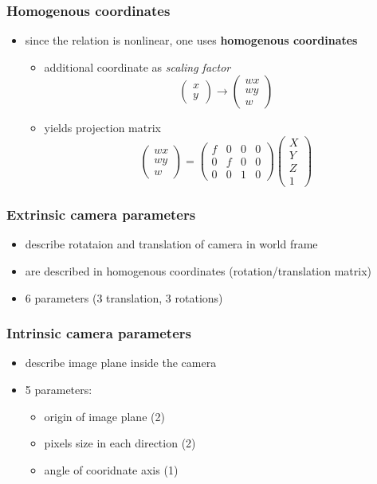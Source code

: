 \documentclass[11pt]{article}
\begin{document}
\subsubsection{Homogenous coordinates}
\label{sec-6-1-1}
\begin{itemize}
\item since the relation is nonlinear, one uses \textbf{homogenous coordinates}
\begin{itemize}
\item additional coordinate as \emph{scaling factor}
       \[ \begin{pmatrix} x\\y \end{pmatrix}
          \rightarrow \begin{pmatrix} wx \\wy \\ w \end{pmatrix} \]
\item yields projection matrix
       \[ \begin{pmatrix} wx \\wy \\ w \end{pmatrix}
          = \begin{pmatrix} f&0&0&0 \\ 0&f&0&0 \\ 0&0&1&0 
            \end{pmatrix}\begin{pmatrix} X\\Y\\Z\\1 \end{pmatrix} \]
\end{itemize}
\end{itemize}
\subsubsection{Extrinsic camera parameters}
\label{sec-6-1-2}
\begin{itemize}
\item describe rotataion and  translation of camera in world frame
\item are described in homogenous coordinates (rotation/translation matrix)
\item 6 parameters (3 translation, 3 rotations)
\end{itemize}
\subsubsection{Intrinsic camera parameters}
\label{sec-6-1-3}
\begin{itemize}
\item describe image plane inside the camera
\item 5 parameters:
\begin{itemize}
\item origin of image plane (2)
\item pixels size in each direction (2)
\item angle of cooridnate axis (1)
\end{itemize}
\end{itemize}
\end{document}
